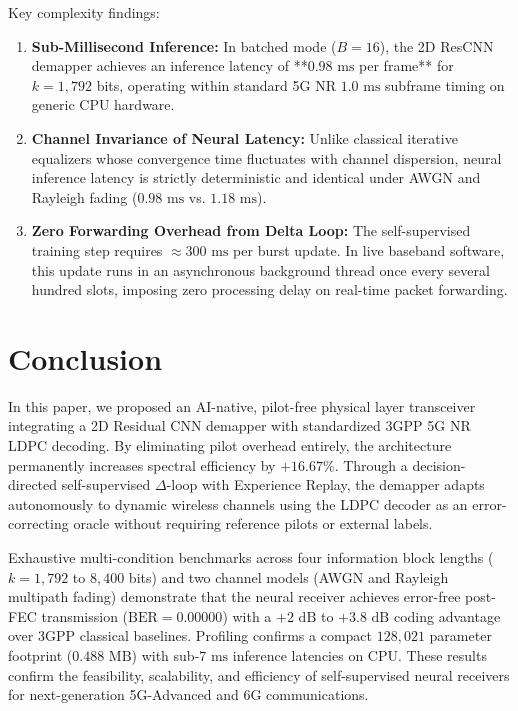 \documentclass[journal]{IEEEtran}
\begin{document}
Key complexity findings:
\begin{enumerate}
    \item \textbf{Sub-Millisecond Inference:} In batched mode ($B=16$), the 2D ResCNN demapper achieves an inference latency of **$0.98\text{ ms}$ per frame** for $k=1,792$ bits, operating within standard 5G NR $1.0\text{ ms}$ subframe timing on generic CPU hardware.
    \item \textbf{Channel Invariance of Neural Latency:} Unlike classical iterative equalizers whose convergence time fluctuates with channel dispersion, neural inference latency is strictly deterministic and identical under AWGN and Rayleigh fading ($0.98\text{ ms}$ vs. $1.18\text{ ms}$).
    \item \textbf{Zero Forwarding Overhead from Delta Loop:} The self-supervised training step requires $\approx 300\text{ ms}$ per burst update. In live baseband software, this update runs in an asynchronous background thread once every several hundred slots, imposing zero processing delay on real-time packet forwarding.
\end{enumerate}

\section{Conclusion}
\label{sec:conclusion}
In this paper, we proposed an AI-native, pilot-free physical layer transceiver integrating a 2D Residual CNN demapper with standardized 3GPP 5G NR LDPC decoding. By eliminating pilot overhead entirely, the architecture permanently increases spectral efficiency by $+16.67\%$. Through a decision-directed self-supervised $\Delta$-loop with Experience Replay, the demapper adapts autonomously to dynamic wireless channels using the LDPC decoder as an error-correcting oracle without requiring reference pilots or external labels.

Exhaustive multi-condition benchmarks across four information block lengths ($k=1,792$ to $8,400$ bits) and two channel models (AWGN and Rayleigh multipath fading) demonstrate that the neural receiver achieves error-free post-FEC transmission ($\text{BER} = 0.00000$) with a $+2\text{ dB}$ to $+3.8\text{ dB}$ coding advantage over 3GPP classical baselines. Profiling confirms a compact $128,021$ parameter footprint ($0.488\text{ MB}$) with sub-$7\text{ ms}$ inference latencies on CPU. These results confirm the feasibility, scalability, and efficiency of self-supervised neural receivers for next-generation 5G-Advanced and 6G communications.
\end{document}
